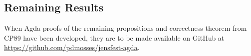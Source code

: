 {\begin{code}
\AgdaSymbol{(}\AgdaSpace{}%
\AgdaSymbol{(}\AgdaSpace{}%
\AgdaSymbol{))}\AgdaSpace{}%
\AgdaSpace{}%
\AgdaSymbol{)}\<%
\\
%
\>[10]\AgdaSpace{}%
\AgdaSpace{}%
\AgdaSymbol{(}\AgdaSpace{}%
\AgdaSymbol{(}\AgdaSpace{}%
\AgdaSymbol{)}\AgdaSpace{}%
\AgdaSpace{}%
\AgdaSpace{}%
\AgdaSpace{}%
\AgdaSymbol{)}\AgdaSpace{}%
\<%
\\
\>[10][@{}l@{\AgdaIndent{0}}]%
\>[12]\AgdaSpace{}%
\AgdaSymbol{(}\AgdaSpace{}%
\AgdaSymbol{(}\AgdaSpace{}%
\AgdaSymbol{))}\AgdaSpace{}%
\AgdaSpace{}%
\AgdaSpace{}%
\AgdaSpace{}%
\AgdaSpace{}%
\AgdaSymbol{(}\AgdaSpace{}%
\AgdaSpace{}%
\AgdaSymbol{)}\<%
\\
%
\>[10]\<%
\end{code}
}

\subsection{Remaining Results}

When Agda proofs of the remaining propositions and correctness theorem from CP89
have been developed, they are to be made available on GitHub at
\url{https://github.com/pdmosses/jensfest-agda}.

